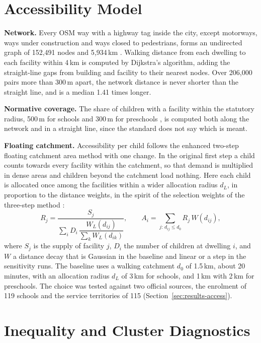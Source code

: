 \section{Accessibility Model}
\label{sec:access-model}

\textbf{Network.} Every OSM way with a highway tag inside the city, except motorways, ways under construction and ways closed to pedestrians, forms an undirected graph of 152,491 nodes and 5,934\,km \cite{boeing2017}. Walking distance from each dwelling to each facility within 4\,km is computed by Dijkstra's algorithm, adding the straight-line gaps from building and facility to their nearest nodes. Over 206,000 pairs more than 300\,m apart, the network distance is never shorter than the straight line, and is a median 1.41 times longer.

\textbf{Normative coverage.} The share of children with a facility within the statutory radius, 500\,m for schools and 300\,m for preschools \cite{sprk2013}, is computed both along the network and in a straight line, since the standard does not say which is meant.

\textbf{Floating catchment.} Accessibility per child follows the enhanced two-step floating catchment area method \cite{luo2003, luo2009} with one change. In the original first step a child counts towards every facility within the catchment, so that demand is multiplied in dense areas and children beyond the catchment load nothing. Here each child is allocated once among the facilities within a wider allocation radius $d_L$, in proportion to the distance weights, in the spirit of the selection weights of the three-step method \cite{wan2012}:
\begin{equation}
R_j = \frac{S_j}{\sum_i D_i \, \dfrac{W_L(d_{ij})}{\sum_{k} W_L(d_{ik})}}, \qquad
A_i = \sum_{j:\, d_{ij} \le d_0} R_j \, W(d_{ij}),
\label{eq:e2sfca}
\end{equation}
where $S_j$ is the supply of facility $j$, $D_i$ the number of children at dwelling $i$, and $W$ a distance decay that is Gaussian in the baseline and linear or a step in the sensitivity runs. The baseline uses a walking catchment $d_0$ of 1.5\,km, about 20 minutes, with an allocation radius $d_L$ of 3\,km for schools, and 1\,km with 2\,km for preschools. The choice was tested against two official sources, the enrolment of 119 schools and the service territories of 115 (Section~\ref{sec:results-access}).

\section{Inequality and Cluster Diagnostics}
\label{sec:equity-methods}

